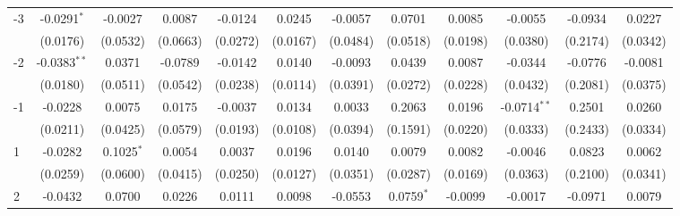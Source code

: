 \begin{adjustbox}{width=650}
\begin{tabular}{lccccccccccc}
    -3    & -0.0291$^{*}$   & -0.0027              & 0.0087                     & -0.0124       & 0.0245                        & -0.0057                     & 0.0701                & 0.0085           & -0.0055        & -0.0934   & 0.0227\\   
                                            & (0.0176)        & (0.0532)             & (0.0663)                   & (0.0272)      & (0.0167)                      & (0.0484)                    & (0.0518)              & (0.0198)         & (0.0380)       & (0.2174)  & (0.0342)\\   
    -2    & -0.0383$^{**}$  & 0.0371               & -0.0789                    & -0.0142       & 0.0140                        & -0.0093                     & 0.0439                & 0.0087           & -0.0344        & -0.0776   & -0.0081\\   
                                            & (0.0180)        & (0.0511)             & (0.0542)                   & (0.0238)      & (0.0114)                      & (0.0391)                    & (0.0272)              & (0.0228)         & (0.0432)       & (0.2081)  & (0.0375)\\   
    -1    & -0.0228         & 0.0075               & 0.0175                     & -0.0037       & 0.0134                        & 0.0033                      & 0.2063                & 0.0196           & -0.0714$^{**}$ & 0.2501    & 0.0260\\   
                                            & (0.0211)        & (0.0425)             & (0.0579)                   & (0.0193)      & (0.0108)                      & (0.0394)                    & (0.1591)              & (0.0220)         & (0.0333)       & (0.2433)  & (0.0334)\\   
    1     & -0.0282         & 0.1025$^{*}$         & 0.0054                     & 0.0037        & 0.0196                        & 0.0140                      & 0.0079                & 0.0082           & -0.0046        & 0.0823    & 0.0062\\   
                                            & (0.0259)        & (0.0600)             & (0.0415)                   & (0.0250)      & (0.0127)                      & (0.0351)                    & (0.0287)              & (0.0169)         & (0.0363)       & (0.2100)  & (0.0341)\\   
    2     & -0.0432         & 0.0700               & 0.0226                     & 0.0111        & 0.0098                        & -0.0553                     & 0.0759$^{*}$          & -0.0099          & -0.0017        & -0.0971   & 0.0079\\   

\end{tabular}
\end{adjustbox}
